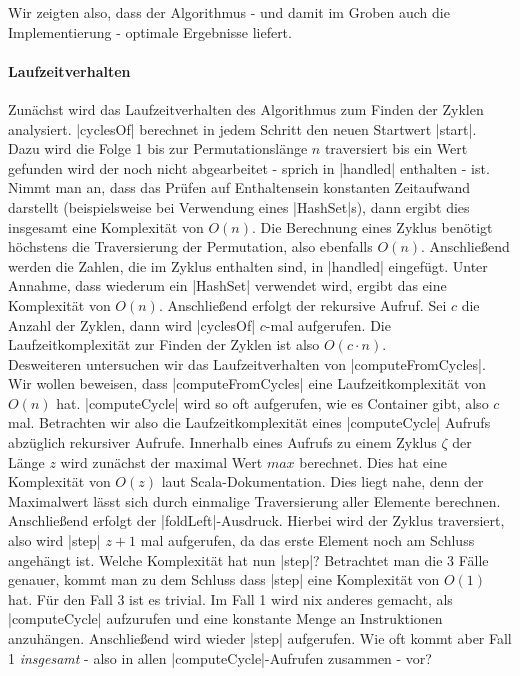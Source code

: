 Wir zeigten also, dass der Algorithmus - und damit im Groben auch die Implementierung - optimale Ergebnisse liefert.

\paragraph{Laufzeitverhalten}
Zunächst wird das Laufzeitverhalten des Algorithmus zum Finden der Zyklen analysiert.
|cyclesOf| berechnet in jedem Schritt den neuen Startwert |start|.
Dazu wird die Folge 1 bis zur Permutationslänge $n$ traversiert bis ein Wert gefunden wird der noch nicht abgearbeitet - sprich in |handled| enthalten - ist.
Nimmt man an, dass das Prüfen auf Enthaltensein konstanten Zeitaufwand darstellt (beispielsweise bei Verwendung eines |HashSet|s), dann ergibt dies insgesamt eine Komplexität von $O(n)$.
Die Berechnung eines Zyklus benötigt höchstens die Traversierung der Permutation, also ebenfalls $O(n)$. %
Anschließend werden die Zahlen, die im Zyklus enthalten sind, in |handled| eingefügt. Unter Annahme, dass wiederum ein |HashSet| verwendet wird, ergibt das eine Komplexität von $O(n)$.
Anschließend erfolgt der rekursive Aufruf. Sei $c$ die Anzahl der Zyklen, dann wird |cyclesOf| $c$-mal aufgerufen.
Die Laufzeitkomplexität zur Finden der Zyklen ist also $O(c \cdot n)$. \\
Desweiteren untersuchen wir das Laufzeitverhalten von |computeFromCycles|. Wir wollen beweisen, dass |computeFromCycles| eine Laufzeitkomplexität von $O(n)$ hat.
|computeCycle| wird so oft aufgerufen, wie es Container gibt, also $c$ mal.
Betrachten wir also die Laufzeitkomplexität eines |computeCycle| Aufrufs abzüglich rekursiver Aufrufe.
Innerhalb eines Aufrufs zu einem Zyklus $\zeta$ der Länge $z$ wird zunächst der maximal Wert $max$ berechnet.
Dies hat eine Komplexität von $O(z)$ laut Scala-Dokumentation. Dies liegt nahe, denn der Maximalwert lässt sich durch einmalige Traversierung aller Elemente berechnen.
Anschließend erfolgt der |foldLeft|-Ausdruck. Hierbei wird der Zyklus traversiert, also wird |step| $z+1$ mal aufgerufen, da das erste Element noch am Schluss angehängt ist.
Welche Komplexität hat nun |step|? Betrachtet man die 3 Fälle genauer, kommt man zu dem Schluss dass |step| eine Komplexität von $O(1)$ hat.
Für den Fall 3 ist es trivial. Im Fall 1 wird nix anderes gemacht, als |computeCycle| aufzurufen und eine konstante Menge an Instruktionen anzuhängen.
Anschließend wird wieder |step| aufgerufen. Wie oft kommt aber Fall 1 \emph{insgesamt} - also in allen |computeCycle|-Aufrufen zusammen - vor?
